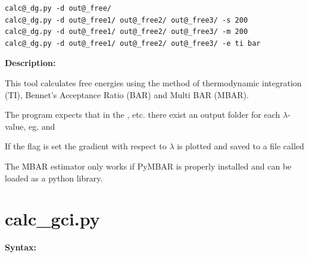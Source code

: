 \documentclass[letterpaper,10pt,english]{manual}
\begin{document}
\begin{Verbatim}[commandchars=@\[\]]
calc@_dg.py -d out@_free/
calc@_dg.py -d out@_free1/ out@_free2/ out@_free3/ -s 200
calc@_dg.py -d out@_free1/ out@_free2/ out@_free3/ -m 200
calc@_dg.py -d out@_free1/ out@_free2/ out@_free3/ -e ti bar
\end{Verbatim}

\textbf{Description:}

This tool calculates free energies using the method of thermodynamic integration (TI), Bennet's Acceptance Ratio (BAR) and Multi BAR (MBAR).

The program expects that in the ,  etc. there exist an output folder for each $\lambda$-value, eg.  and 

If the  flag is set the gradient with respect to $\lambda$ is plotted and saved to a file called 

The MBAR estimator only works if PyMBAR is properly installed and can be loaded as a python library.


\section{calc\_gci.py}

\textbf{Syntax:}
\end{document}
